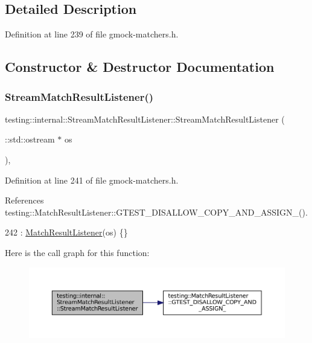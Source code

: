 \subsection{Detailed Description}


Definition at line 239 of file gmock-\/matchers.\+h.



\subsection{Constructor \& Destructor Documentation}
\mbox{\label{classtesting_1_1internal_1_1StreamMatchResultListener_a81985760741d818745237df002d65d04}} 
\subsubsection{\texorpdfstring{Stream\+Match\+Result\+Listener()}{StreamMatchResultListener()}}
{\footnotesize\ttfamily testing\+::internal\+::\+Stream\+Match\+Result\+Listener\+::\+Stream\+Match\+Result\+Listener (\begin{DoxyParamCaption}\item[{\+::std\+::ostream $\ast$}]{os }\end{DoxyParamCaption})\hspace{0.3cm}{\ttfamily [inline]}, {\ttfamily [explicit]}}



Definition at line 241 of file gmock-\/matchers.\+h.



References testing\+::\+Match\+Result\+Listener\+::\+G\+T\+E\+S\+T\+\_\+\+D\+I\+S\+A\+L\+L\+O\+W\+\_\+\+C\+O\+P\+Y\+\_\+\+A\+N\+D\+\_\+\+A\+S\+S\+I\+G\+N\+\_\+().


\begin{DoxyCode}
242       : \hyperlink{classtesting_1_1MatchResultListener_a245c360286cd0496d22a4d2fde80eb0b}{MatchResultListener}(os) \{\}
\end{DoxyCode}
Here is the call graph for this function\+:
\nopagebreak
\begin{figure}[H]
\begin{center}
\leavevmode
\includegraphics[width=350pt]{classtesting_1_1internal_1_1StreamMatchResultListener_a81985760741d818745237df002d65d04_cgraph}
\end{center}
\end{figure}


